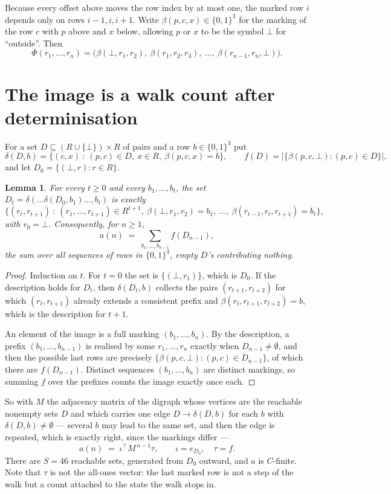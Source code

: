 \documentclass[11pt,a4paper]{article}
\theoremstyle{plain}
\newtheorem{lemma}[theorem]{Lemma}
\theoremstyle{definition}
\begin{document}
Because every offset above moves the row index by at most one, the marked row $i$ depends only
on rows $i-1,i,i+1$. Write $\beta(p,c,x)\in\{0,1\}^{3}$ for the marking of the row $c$
with $p$ above and $x$ below, allowing $p$ or $x$ to be the symbol $\bot$ for ``outside''.
Then
\[
\Phi(r_1,\dots,r_n)=\bigl(\beta(\bot,r_1,r_2),\ \beta(r_1,r_2,r_3),\ \dots,\
\beta(r_{n-1},r_n,\bot)\bigr).
\]

\section{The image is a walk count after determinisation}

For a set $D\subseteq(R\cup\{\bot\})\times R$ of pairs and a row $b\in\{0,1\}^{3}$ put
\[
\delta(D,b)=\{(c,x)\ :\ (p,c)\in D,\ x\in R,\ \beta(p,c,x)=b\},\qquad
f(D)=\bigl|\{\beta(p,c,\bot):(p,c)\in D\}\bigr| ,
\]
and let $D_0=\{(\bot,r):r\in R\}$.

\begin{lemma}\label{lem:det}
For every $t\ge0$ and every $b_1,\dots,b_t$, the set
$D_t=\delta(\dots\delta(D_0,b_1)\dots,b_t)$ is exactly
\[
\{(r_t,r_{t+1})\ :\ (r_1,\dots,r_{t+1})\in R^{t+1},\ \beta(\bot,r_1,r_2)=b_1,\ \dots,\
\beta(r_{t-1},r_t,r_{t+1})=b_t\} ,
\]
with $r_0=\bot$. Consequently, for $n\ge1$,
\[
a(n)\;=\;\sum_{b_1,\dots,b_{n-1}}f(D_{n-1}),
\]
the sum over all sequences of rows in $\{0,1\}^{3}$, empty $D$'s contributing nothing.
\end{lemma}

\begin{proof}
Induction on $t$. For $t=0$ the set is $\{(\bot,r_1)\}$, which is $D_0$. If the description
holds for $D_t$, then $\delta(D_t,b)$ collects the pairs $(r_{t+1},r_{t+2})$ for which
$(r_t,r_{t+1})$ already extends a consistent prefix and
$\beta(r_t,r_{t+1},r_{t+2})=b$, which is the description for $t+1$.

An element of the image is a full marking $(b_1,\dots,b_n)$. By the description, a prefix
$(b_1,\dots,b_{n-1})$ is realised by some $r_1,\dots,r_n$ exactly when $D_{n-1}\neq
\emptyset$, and then the possible last rows are precisely
$\{\beta(p,c,\bot):(p,c)\in D_{n-1}\}$, of which there are $f(D_{n-1})$. Distinct
sequences $(b_1,\dots,b_n)$ are distinct markings, so summing $f$ over the prefixes counts the
image exactly once each.
\end{proof}

So with $M$ the adjacency matrix of the digraph whose vertices are the reachable nonempty sets
$D$ and which carries one edge $D\to\delta(D,b)$ for each $b$ with $\delta(D,b)\neq\emptyset$
--- several $b$ may lead to the same set, and then the edge is repeated, which is exactly
right, since the markings differ ---
\[
a(n)\;=\;\iota^{\!\top}M^{\,n-1}\tau,\qquad \iota=e_{D_0},\quad \tau=f .
\]
There are $S=46$ reachable sets, generated from $D_0$ outward, and $a$ is $C$-finite. Note
that $\tau$ is not the all-ones vector: the last marked row is not a step of the walk but a
count attached to the state the walk stops in.
\end{document}
